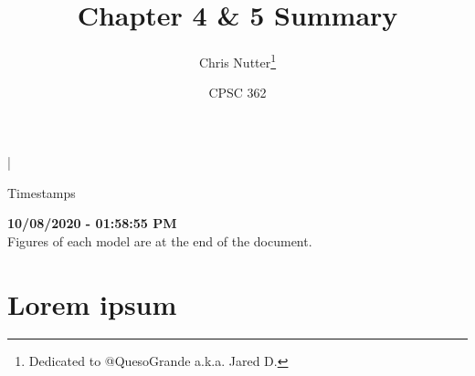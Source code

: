 \documentclass[12pt]{article}
\title{Chapter 4 \& 5 Summary}
\author{Chris Nutter\thanks{Dedicated to @QuesoGrande a.k.a. Jared D.}}
\date{CPSC 362}
\renewcommand{\abstractname}{\small{\begin{center}Timestamps\end{center}\vspace{-4ex}}}
\begin{document}
\maketitle

\begin{center} \vspace{-4ex}|\vspace{-3ex} \end{center}

\noindent\abstractname
\begin{center}
    \normalsize\textbf{10/08/2020 - 01:58:55 PM}\\
    Figures of each model are at the end of the document.
\end{center}
\normalsize

\tableofcontents    
\vspace{4ex}


\section{Lorem ipsum}
    \lipsum[1]
\end{document}
